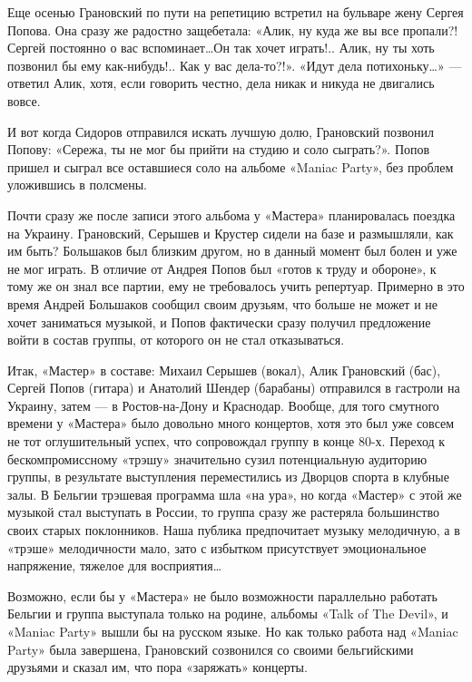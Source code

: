 \documentclass[10pt, twoside]{book}
\begin{document}
Еще осенью Грановский по пути на репетицию встретил на бульваре жену Сергея Попова. Она сразу же радостно защебетала:
«Алик, ну куда же вы все пропали?! Сергей постоянно о вас вспоминает\ldots Он так хочет играть!.. Алик, ну ты хоть
позвонил бы ему как-нибудь!.. Как у вас дела-то?!». «Идут дела потихоньку\ldots» — ответил Алик, хотя, если говорить
честно, дела никак и никуда не двигались вовсе.

И вот когда Сидоров отправился искать лучшую долю, Грановский позвонил Попову: «Сережа, ты не мог бы прийти на студию и
соло сыграть?». Попов пришел и сыграл все оставшиеся соло на альбоме «Maniac Party», без проблем уложившись в полсмены.

Почти сразу же после записи этого альбома у «Мастера» планировалась поездка на Украину. Грановский, Серышев и Крустер
сидели на базе и размышляли, как им быть? Большаков был близким другом, но в данный момент был болен и уже не мог
играть. В отличие от Андрея Попов был «готов к труду и обороне», к тому же он знал все партии, ему не требовалось учить
репертуар. Примерно в это время Андрей Большаков сообщил своим друзьям, что больше не может и не хочет заниматься
музыкой, и Попов фактически сразу получил предложение войти в состав группы, от которого он не стал отказываться.

Итак, «Мастер» в составе: Михаил Серышев (вокал), Алик Грановский (бас), Сергей Попов (гитара) и Анатолий Шендер
(барабаны) отправился в гастроли на Украину, затем — в Ростов-на-Дону и Краснодар. Вообще, для того смутного времени у
«Мастера» было довольно много концертов, хотя это был уже совсем не тот оглушительный успех, что сопровождал группу в
конце 80-х. Переход к бескомпромиссному «трэшу» значительно сузил потенциальную аудиторию группы, в результате
выступления переместились из Дворцов спорта в клубные залы. В Бельгии трэшевая программа шла «на ура», но когда «Мастер»
с этой же музыкой стал выступать в России, то группа сразу же растеряла большинство своих старых поклонников. Наша
публика предпочитает музыку мелодичную, а в «трэше» мелодичности мало, зато с избытком присутствует эмоциональное
напряжение, тяжелое для восприятия\ldots

Возможно, если бы у «Мастера» не было возможности параллельно работать Бельгии и группа выступала только на родине,
альбомы «Talk of The Devil», и «Maniac Party» вышли бы на русском языке. Но как только работа над «Maniac Party» была
завершена, Грановский созвонился со своими бельгийскими друзьями и сказал им, что пора «заряжать» концерты.
\end{document}
